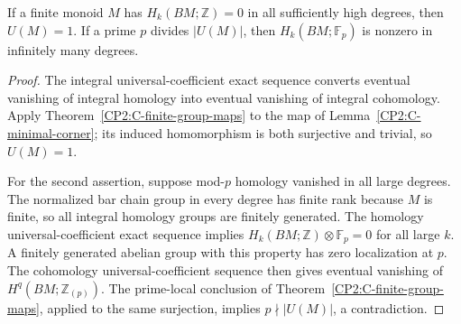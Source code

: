 \begin{theorem}
\label{CP2:C-unbounded-homology}
If a finite monoid $M$ has $H_k(BM;\mathbb Z)=0$ in all sufficiently
high degrees, then $U(M)=1$.  If a prime $p$ divides $|U(M)|$, then
$H_k(BM;\mathbb F_p)$ is nonzero in infinitely many degrees.
\end{theorem}
\begin{proof}
The integral universal-coefficient exact sequence converts eventual
vanishing of integral homology into eventual vanishing of integral
cohomology.  Apply Theorem~\ref{CP2:C-finite-group-maps} to the map
of Lemma~\ref{CP2:C-minimal-corner}; its induced homomorphism is both
surjective and trivial, so $U(M)=1$.

For the second assertion, suppose mod-$p$ homology vanished in all
large degrees.  The normalized bar chain group in every degree has
finite rank because $M$ is finite, so all integral homology groups
are finitely generated.  The homology universal-coefficient exact
sequence implies $H_k(BM;\mathbb Z)\otimes\mathbb F_p=0$ for all
large $k$.  A finitely generated abelian group with this property
has zero localization at $p$.  The cohomology universal-coefficient
sequence then gives eventual vanishing of
$H^q(BM;\mathbb Z_{(p)})$.  The prime-local conclusion of
Theorem~\ref{CP2:C-finite-group-maps}, applied to the same surjection,
implies $p\nmid|U(M)|$, a contradiction.
\end{proof}

